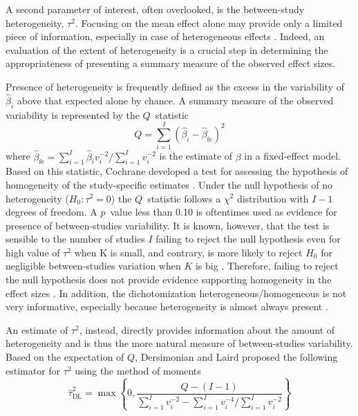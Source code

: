 \documentclass[11pt,a4paper,twoside,openany]{book}\usepackage{knitr}
\begin{document}
{A second parameter of interest, often overlooked, is the between-study heterogeneity, $\tau^2$. Focusing on the mean effect alone may provide only a limited piece of information, especially in case of heterogeneous effects \citep{borenstein2010basic}. Indeed, an evaluation of the extent of heterogeneity is a crucial step in determining the appropriateness of presenting a summary measure of the observed effect sizes.

Presence of heterogeneity is frequently defined as the excess in the variability of $\hat \beta_i$ above that expected alone by chance. A summary measure of the observed variability is represented by the $Q$~statistic
\begin{equation}
Q = \sum_{i=1}^I \left(\hat \beta_i - \hat \beta_{\text{fe}} \right)^2
\label{eq:Q}
\end{equation}
\noindent where $\hat \beta_{\text{fe}} = \sum_{i=1}^I \hat \beta_i v_i^{-2}/ \sum_{i=1}^I v_i^{-2}$ is the estimate of $\beta$ in a fixed-effect model. Based on this statistic, Cochrane developed a test for assessing the hypothesis of homogeneity of the study-specific estimates \citep{cochran1954combination}. Under the null hypothesis of no heterogeneity ($H_0: \tau^2 = 0$) the $Q$~statistic follows a $\chi^2$ distribution with $I-1$ degrees of freedom. A $p$~value less than 0.10 is oftentimes used as evidence for presence of between-studies variability. It is known, however, that the test is sensible to the number of studies $I$ failing to reject the null hypothesis even for high value of $\tau^2$ when K is small, and contrary, is more likely to reject $H_0$ for negligible between-studies variation when $K$ is big \citep{higgins2002quantifying, takkouche1999evaluation}. Therefore, failing to reject the null hypothesis does not provide evidence supporting homogeneity in the effect sizes \citep{biggerstaff1997incorporating}. In addition, the dichotomization heterogeneous/homogeneous is not very informative, especially because heterogeneity is almost always present \citep{higgins2008commentary}. 

An estimate of $\tau^2$, instead, directly provides information about the amount of heterogeneity and is thus the more natural measure of between-studies variability. Based on the expectation of $Q$, Dersimonian and Laird proposed the following estimator for $\tau^2$ using the method of moments \citep{dersimonian1986meta}
\begin{equation}
\hat \tau^2_{\text{DL}} = \max \left\{0, \frac{Q - (I-1)}{\sum_{i=1}^I v_i^{-2} - \sum_{i=1}^I v_i^{-4}/\sum_{i=1}^I v_i^{-2} } \right\}
\label{eq:tau2DL}
\end{equation}

}
\end{document}
